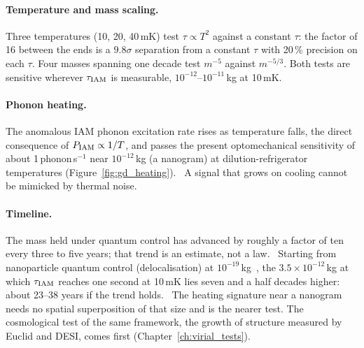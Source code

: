 \paragraph{Temperature and mass scaling.} Three temperatures (10, 20, 40\,mK) test $\tau\propto T^2$ against a constant $\tau$: the factor of 16 between the
ends is a $9.8\sigma$ separation from a constant $\tau$ with 20\,\% precision on each $\tau$. Four masses spanning one decade test $m^{-5}$ against $m^{-5/3}$. Both tests are
sensitive wherever $\tau_{\rm IAM}$ is measurable, $10^{-12}$--$10^{-11}$\,kg at 10\,mK. \calc

\paragraph{Phonon heating.} The anomalous IAM phonon excitation rate rises as temperature falls, the direct consequence of $P_{\rm IAM}\propto1/T$, and passes
the present optomechanical sensitivity of about 1\,phonon\,s$^{-1}$ near $10^{-12}$\,kg (a nanogram) at dilution-refrigerator temperatures
(Figure~\ref{fig:gd_heating}). \prediction\ A signal that grows on cooling cannot be mimicked by thermal noise.

\paragraph{Timeline.} The mass held under quantum control has advanced by roughly a factor of ten every three to five years; that trend is an estimate,
not a law. \calc\ Starting from nanoparticle quantum control (delocalisation) at $10^{-19}$\,kg~\cite{Rossi2025,Neumeier2024}, the $3.5\times10^{-12}$\,kg
at which $\tau_{\rm IAM}$ reaches one second at 10\,mK lies seven and a half decades higher: about 23--38 years if the trend holds. \calc\ The heating signature near a nanogram needs no spatial superposition of that size and is
the nearer test. The cosmological test of the same framework, the growth of structure measured by Euclid and DESI, comes first
(Chapter~\ref{ch:virial_tests}).

